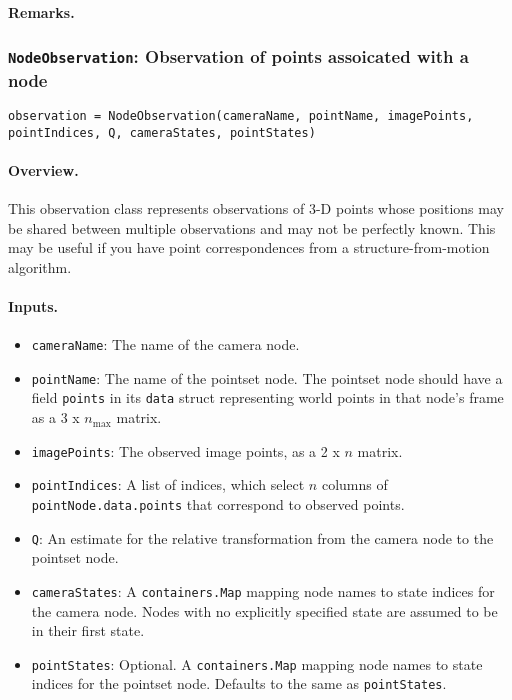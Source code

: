 \paragraph{Remarks.}

\subsubsection{\texttt{NodeObservation}: Observation of points assoicated with a node}

\texttt{observation = NodeObservation(cameraName, pointName, imagePoints, pointIndices, Q, cameraStates, pointStates) }

\paragraph{Overview.} This observation class represents observations of 3-D points whose positions 
may be shared between multiple observations and may not be perfectly known. 
This may be useful if you have point correspondences from a structure-from-motion algorithm.

\paragraph{Inputs.}
\begin{itemize}
	\item \texttt{cameraName}: The name of the camera node.
	\item \texttt{pointName}: The name of the pointset node. The pointset node should have a field \texttt{points} 
        in its \texttt{data} struct representing world points in that node's frame as a 3 x $n_\mathrm{max}$ matrix.
    \item \texttt{imagePoints}: The observed image points, as a 2 x $n$ matrix.
    \item \texttt{pointIndices}: A list of indices, which select $n$ columns of \texttt{pointNode.data.points} that 
        correspond to observed points.
    \item \texttt{Q}: An estimate for the relative transformation from the camera node to the pointset node.
    \item \texttt{cameraStates}: A \texttt{containers.Map} mapping node names to state indices for the camera node. 
        Nodes with no explicitly specified state are assumed to be in their first state.
    \item \texttt{pointStates}: Optional. A \texttt{containers.Map} mapping node names to state indices for the pointset node. 
        Defaults to the same as \texttt{pointStates}.
\end{itemize}
